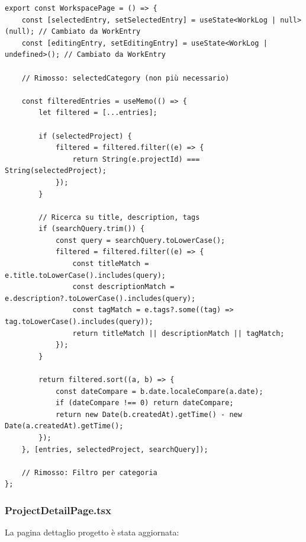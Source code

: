 \documentclass[11pt,a4paper]{article}
\begin{document}
\begin{lstlisting}[caption=WorkspacePage Aggiornato]
export const WorkspacePage = () => {
    const [selectedEntry, setSelectedEntry] = useState<WorkLog | null>(null); // Cambiato da WorkEntry
    const [editingEntry, setEditingEntry] = useState<WorkLog | undefined>(); // Cambiato da WorkEntry
    
    // Rimosso: selectedCategory (non più necessario)
    
    const filteredEntries = useMemo(() => {
        let filtered = [...entries];
        
        if (selectedProject) {
            filtered = filtered.filter((e) => {
                return String(e.projectId) === String(selectedProject);
            });
        }
        
        // Ricerca su title, description, tags
        if (searchQuery.trim()) {
            const query = searchQuery.toLowerCase();
            filtered = filtered.filter((e) => {
                const titleMatch = e.title.toLowerCase().includes(query);
                const descriptionMatch = e.description?.toLowerCase().includes(query);
                const tagMatch = e.tags?.some((tag) => tag.toLowerCase().includes(query));
                return titleMatch || descriptionMatch || tagMatch;
            });
        }
        
        return filtered.sort((a, b) => {
            const dateCompare = b.date.localeCompare(a.date);
            if (dateCompare !== 0) return dateCompare;
            return new Date(b.createdAt).getTime() - new Date(a.createdAt).getTime();
        });
    }, [entries, selectedProject, searchQuery]);
    
    // Rimosso: Filtro per categoria
};
\end{lstlisting}

\subsubsection{ProjectDetailPage.tsx}

La pagina dettaglio progetto è stata aggiornata:
\end{document}

